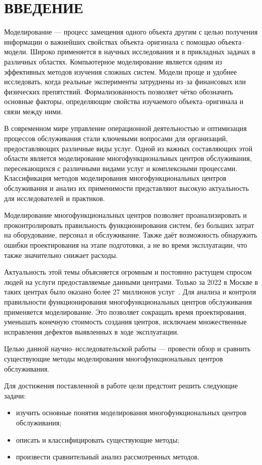 \chapter*{ВВЕДЕНИЕ}

Моделирование --- процесс замещения одного объекта другим с целью получения информации о важнейших свойствах объекта--оригинала с помощью объекта--модели. Широко применяется в научных исследования и в прикладных задачах в различных областях. Компьютерное моделирование является одним из эффективных методов изучения сложных систем. Модели проще и удобнее исследовать, когда реальные эксперименты затруднены из--за финансовых или физических препятствий. Формализованность позволяет чётко обозначить основные факторы, определяющие свойства изучаемого объекта--оригинала и связи между ними.

В современном мире управление операционной деятельностью и оптимизация процессов обслуживания стали ключевыми вопросами для организаций, предоставляющих различные виды услуг. Одной из важных составляющих этой области является моделирование многофункциональных центров обслуживания, пересекающихся с различными видами услуг и комплексными процессами. Классификация методов моделирования многофункциональных центров обслуживания и анализ их применимости представляют высокую актуальность для исследователей и практиков.

Моделирование многофункциональных центров позволяет проанализировать и проконтролировать правильность функционирования систем, без больших затрат на оборудование, персонал и обслуживание. Также даёт возможность обнаружить ошибки проектирования на этапе подготовки, а не во время эксплуатации, что также значительно снижает расходы.

Актуальность этой темы объясняется огромным и постоянно растущем спросом людей на услуги предоставляемые данными центрами. Только за 2022 в Москве в таких центрах было оказано более 27 миллионов услуг~\cite{actual}. Для анализа и контроля правильности функционирования многофункциональных центров обслуживания применяется моделирование. Это позволяет сокращать время проектирования, уменьшать конечную стоимость создания центров, исключаем множественные исправления дефектов выявленных в ходе эксплуатации.

Целью данной научно--исследовательской работы --- провести обзор и сравнить существующие методы моделирования многофункциональных центров обслуживания.

Для достижения поставленной в работе цели предстоит решить следующие задачи:
\begin{itemize}[label=---]
	\item изучить основные понятия моделирования многофункциональных центров обслуживания;
	\item описать и классифицировать существующие методы;
	\item произвести сравнительный анализ рассмотренных методов.
\end{itemize}
